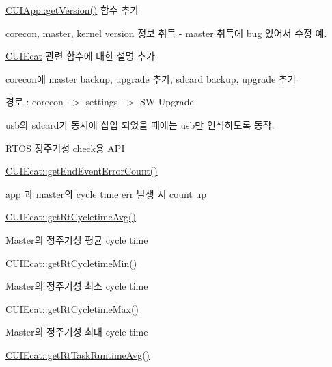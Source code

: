 \begin{DoxyEnumerate}
\item \hyperlink{classCUIApp_a50b55afe3b66bc00cb1e2e34ed8db2b0}{C\-U\-I\-App\-::get\-Version()} 함수 추가
\begin{DoxyItemize}
\item corecon, master, kernel version 정보 취득 -\/ master 취득에 bug 있어서 수정 예.
\end{DoxyItemize}
\item \hyperlink{classCUIEcat}{C\-U\-I\-Ecat} 관련 함수에 대한 설명 추가
\item corecon에 master backup, upgrade 추가, sdcard backup, upgrade 추가
\begin{DoxyItemize}
\item 경로 \-: corecon -\/$>$ settings -\/$>$ S\-W Upgrade
\item usb와 sdcard가 동시에 삽입 되었을 때에는 usb만 인식하도록 동작.
\end{DoxyItemize}
\item R\-T\-O\-S 정주기성 check용 A\-P\-I
\begin{DoxyItemize}
\item \hyperlink{classCUIEcat_a49fba779055b9959e804b3d6587f9799}{C\-U\-I\-Ecat\-::get\-End\-Event\-Error\-Count()}
\begin{DoxyItemize}
\item app 과 master의 cycle time err 발생 시 count up
\end{DoxyItemize}
\item \hyperlink{classCUIEcat_ab62988589c529181b1b9716910d6e66a}{C\-U\-I\-Ecat\-::get\-Rt\-Cycletime\-Avg()}
\begin{DoxyItemize}
\item Master의 정주기성 평균 cycle time
\end{DoxyItemize}
\item \hyperlink{classCUIEcat_aee10d1bfa0042f7f7eed3fb799353643}{C\-U\-I\-Ecat\-::get\-Rt\-Cycletime\-Min()}
\begin{DoxyItemize}
\item Master의 정주기성 최소 cycle time
\end{DoxyItemize}
\item \hyperlink{classCUIEcat_af6d43ab5430d66093cec76234055baa7}{C\-U\-I\-Ecat\-::get\-Rt\-Cycletime\-Max()}
\begin{DoxyItemize}
\item Master의 정주기성 최대 cycle time
\end{DoxyItemize}
\item \hyperlink{classCUIEcat_adeb5b823fd182c274bcac03a9cfae560}{C\-U\-I\-Ecat\-::get\-Rt\-Task\-Runtime\-Avg()}

\end{DoxyItemize}
\end{DoxyEnumerate}
